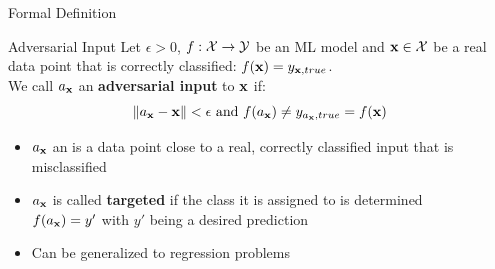 \documentclass[11pt,compress,t,notes=noshow, aspectratio=169, xcolor=table]{beamer}
\begin{document}
\begin{vbframe}[c]{Formal Definition}
\begin{block}{Adversarial Input}
Let $\epsilon>0$, $f:\Xspace \rightarrow \Yspace$ be an ML model and $\xv \in \Xspace$ be a real data point that is correctly classified: $f(\xv)=y_{\xv,true}$. \\\medskip
 We call $a_{\xv}$ an \textbf{adversarial input} to $\xv$ if:
\begin{equation*}
    \| a_{\xv}- \xv\|<\epsilon\text{ and } f(a_{\xv})\neq y_{a_{\xv},true}=f(\xv)
\end{equation*}
\end{block}
\begin{itemize}
    \item $a_{\xv}$ an is a data point close to a real, correctly classified input that is misclassified
    \item $a_{\xv}$ is called \textbf{targeted} if the class it is assigned to is determined\\
    $f(a_{\xv})=y'$ with $y'$ being a desired prediction
    \item Can be generalized to regression problems
\end{itemize}
\end{vbframe}


\end{document}
